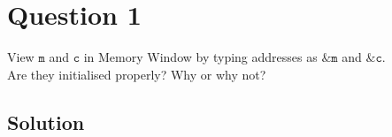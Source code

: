 \section*{Question 1}

View \(\texttt{m}\) and \(\texttt{c}\) in Memory Window by typing addresses as \(\texttt{\&m}\) and \(\texttt{\&c}\).\\
Are they initialised properly?
Why or why not?

\subsection*{Solution}
